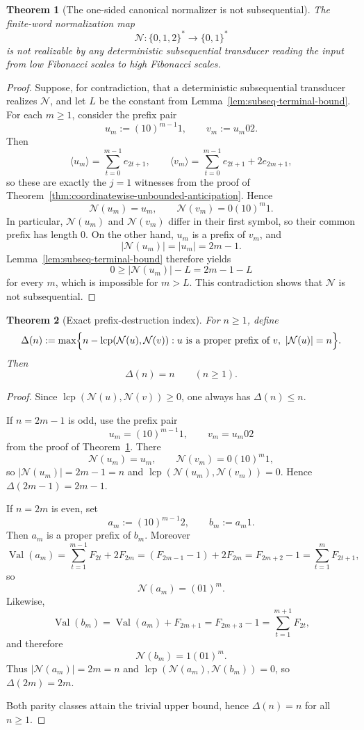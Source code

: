\documentclass[11pt,letterpaper]{article}
\numberwithin{equation}{section}
\theoremstyle{plain}
\newtheorem{theorem}{Theorem}[section]
\theoremstyle{definition}
\theoremstyle{remark}
\DeclareMathOperator{\Val}{Val}
\DeclareMathOperator{\lcp}{lcp}
\begin{document}
\begin{theorem}[The one-sided canonical normalizer is not subsequential]\label{thm:canonical-not-subsequential}
The finite-word normalization map
\[
\mathcal N:\{0,1,2\}^\ast\to\{0,1\}^\ast
\]
is not realizable by any deterministic subsequential transducer reading the
input from low Fibonacci scales to high Fibonacci scales.
\end{theorem}

\begin{proof}
Suppose, for contradiction, that a deterministic subsequential transducer
realizes $\mathcal N$, and let $L$ be the constant from
Lemma~\ref{lem:subseq-terminal-bound}.  For each $m\ge 1$, consider the prefix
pair
\[
u_m:=(10)^{m-1}1,
\qquad
v_m:=u_m 02.
\]
Then
\[
\langle u_m\rangle=\sum_{t=0}^{m-1} e_{2t+1},
\qquad
\langle v_m\rangle=\sum_{t=0}^{m-1} e_{2t+1}+2e_{2m+1},
\]
so these are exactly the $j=1$ witnesses from the proof of
Theorem~\ref{thm:coordinatewise-unbounded-anticipation}.  Hence
\[
\mathcal N(u_m)=u_m,
\qquad
\mathcal N(v_m)=0(10)^m1.
\]
In particular, $\mathcal N(u_m)$ and $\mathcal N(v_m)$ differ in their first
symbol, so their common prefix has length $0$.  On the other hand, $u_m$ is a
prefix of $v_m$, and
\[
|\mathcal N(u_m)|=|u_m|=2m-1.
\]
Lemma~\ref{lem:subseq-terminal-bound} therefore yields
\[
0\ge |\mathcal N(u_m)|-L = 2m-1-L
\]
for every $m$, which is impossible for $m>L$.  This contradiction shows that
$\mathcal N$ is not subsequential.
\end{proof}

\begin{theorem}[Exact prefix-destruction index]\label{thm:exact-prefix-destruction}
For $n\ge 1$, define
\[
\Delta(n):=
\max\Bigl\{
n-\lcp(\mathcal N(u),\mathcal N(v)):
u\text{ is a proper prefix of }v,\ |\mathcal N(u)|=n
\Bigr\}.
\]
Then
\[
\Delta(n)=n
\qquad (n\ge 1).
\]
\end{theorem}

\begin{proof}
Since $\lcp(\mathcal N(u),\mathcal N(v))\ge 0$, one always has
$\Delta(n)\le n$.

If $n=2m-1$ is odd, use the prefix pair
\[
u_m=(10)^{m-1}1,
\qquad
v_m=u_m02
\]
from the proof of Theorem~\ref{thm:canonical-not-subsequential}.  There
\[
\mathcal N(u_m)=u_m,
\qquad
\mathcal N(v_m)=0(10)^m1,
\]
so $|\mathcal N(u_m)|=2m-1=n$ and
$\lcp(\mathcal N(u_m),\mathcal N(v_m))=0$.  Hence $\Delta(2m-1)=2m-1$.

If $n=2m$ is even, set
\[
a_m:=(10)^{m-1}2,
\qquad
b_m:=a_m1.
\]
Then $a_m$ is a proper prefix of $b_m$.  Moreover
\[
\Val(a_m)=\sum_{t=1}^{m-1}F_{2t}+2F_{2m}
=(F_{2m-1}-1)+2F_{2m}=F_{2m+2}-1
=\sum_{t=1}^{m}F_{2t+1},
\]
so
\[
\mathcal N(a_m)=(01)^m.
\]
Likewise,
\[
\Val(b_m)=\Val(a_m)+F_{2m+1}=F_{2m+3}-1
=\sum_{t=1}^{m+1}F_{2t},
\]
and therefore
\[
\mathcal N(b_m)=1(01)^m.
\]
Thus $|\mathcal N(a_m)|=2m=n$ and
$\lcp(\mathcal N(a_m),\mathcal N(b_m))=0$, so $\Delta(2m)=2m$.

Both parity classes attain the trivial upper bound, hence $\Delta(n)=n$ for
all $n\ge 1$.
\end{proof}
\end{document}
